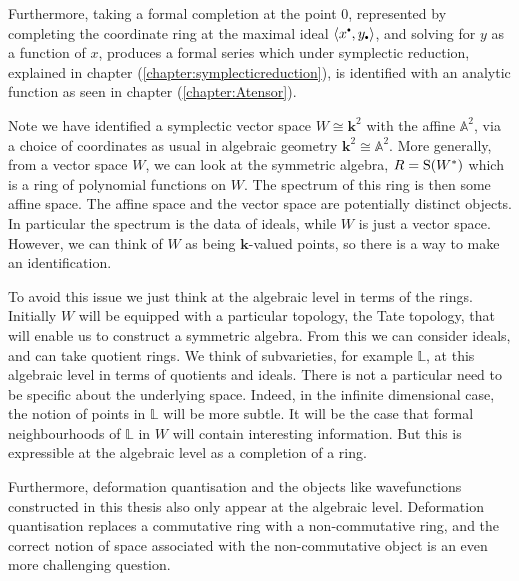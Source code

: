     
    Furthermore, taking a formal completion at the point \(0\), represented by completing the coordinate ring at the maximal ideal \( \langle x^{\sbt}, y_{\sbt} \rangle\), and solving for \(y \) as a function of \(x\), produces a formal series which under symplectic reduction, explained in chapter (\ref{chapter:symplecticreduction}), is identified with an analytic function as seen in chapter (\ref{chapter:Atensor}).
    
    
    \begin{rem}
    Note we have identified a symplectic vector space \(W \cong \mathbf{k}^2\) with the affine \( \mathbb{A}^2\), via a choice of coordinates as usual in algebraic geometry \( \mathbf{k}^2 \cong \mathbb{A}^2\). More generally, from a vector space \(W\), we can look at the symmetric algebra, \( R=\mathrm{S}(W^*)\) which is a ring of polynomial functions on \(W\). The spectrum of this ring is then some affine space. The affine space and the vector space are potentially distinct objects. In particular the spectrum is the data of ideals, while \(W\) is just a vector space. However, we can think of \(W\) as being \(\mathbf{k}\)-valued points, so there is a way to make an identification.
    
    To avoid this issue we just think at the algebraic level in terms of the rings. Initially \(W\) will be equipped with a particular topology, the Tate topology, that will enable us to construct a symmetric algebra. From this we can consider ideals, and can take quotient rings. We think of subvarieties, for example \( \mathbb{L}\), at this algebraic level in terms of quotients and ideals. There is not a particular need to be specific about the underlying space. Indeed, in the infinite dimensional case, the notion of points in \( \mathbb{L}\) will be more subtle. It will be the case that formal neighbourhoods of \( \mathbb{L}\) in \(W\) will contain interesting information. But this is expressible at the algebraic level as a completion of a ring.
    
    Furthermore, deformation quantisation and the objects like wavefunctions constructed in this thesis also only appear at the algebraic level. Deformation quantisation replaces a commutative ring with a non-commutative ring, and the correct notion of space associated with the non-commutative object is an even more challenging question.
    \end{rem}

    

